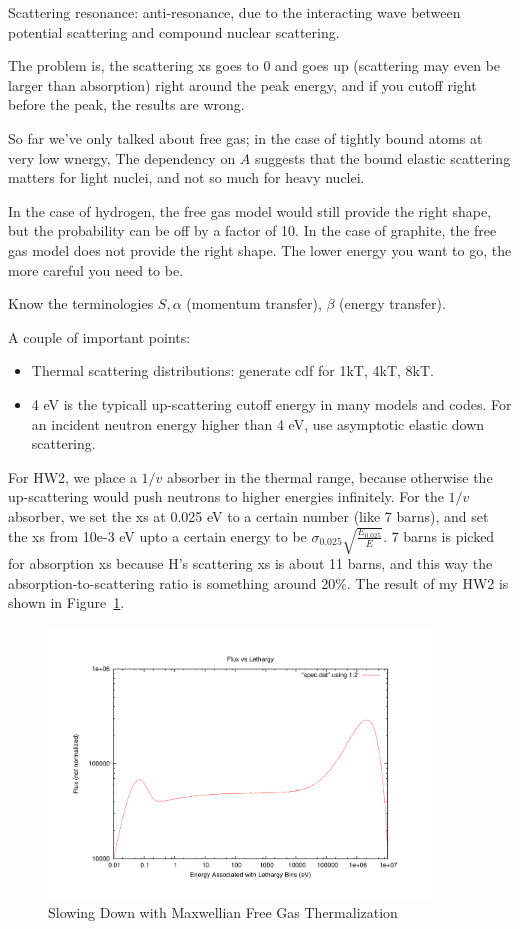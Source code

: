 \documentclass{school-22.211-notes}
\begin{document}
Scattering resonance: anti-resonance, due to the interacting wave between potential scattering and compound nuclear scattering. 

The problem is, the scattering xs goes to 0 and goes up (scattering may even be larger than absorption) right around the peak energy, and if you cutoff right before the peak, the results are wrong. 

So far we've only talked about free gas; in the case of tightly bound atoms at very low wnergy, 
The dependency on $A$ suggests that the bound elastic scattering matters for light nuclei, and not so much for heavy nuclei. 

In the case of hydrogen, the free gas model would still provide the right shape, but the probability can be off by a factor of 10. In the case of graphite, the free gas model does not provide the right shape. The lower energy you want to go, the more careful you need to be. 

Know the terminologies $S, \alpha$ (momentum transfer), $\beta$ (energy transfer). 

A couple of important points:
\begin{itemize}
\item Thermal scattering distributions: generate cdf for 1kT, 4kT, 8kT.  
\item 4 eV is the typicall up-scattering cutoff energy in many models and codes. For an incident neutron energy higher than 4 eV, use asymptotic elastic down scattering. 
\end{itemize}

For HW2, we place a $1/v$ absorber in the thermal range, because otherwise the up-scattering would push neutrons to higher energies infinitely. For the $1/v$ absorber, we set the xs at 0.025 eV to a certain number (like 7 barns), and set the xs from 10e-3 eV upto a certain energy to be $\sigma_{0.025} \sqrt{\frac{E_{0.025}}{E}}$. 7 barns is picked for absorption xs because H's scattering xs is about 11 barns, and this way the absorption-to-scattering ratio is something around 20\%. The result of my HW2 is shown in Figure~\ref{pset2}.
\begin{figure}
  \centering
  \includegraphics[width=4in]{images/spec.uncrop.pdf}
  \caption{Slowing Down with Maxwellian Free Gas Thermalization} \label{pset2}
\end{figure}
\end{document}

